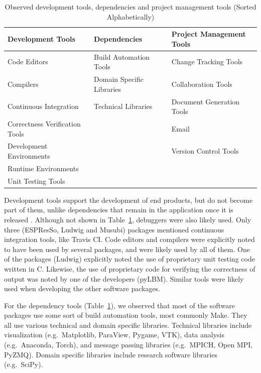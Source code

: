 \documentclass[final, 3p, times, authoryear]{elsarticle}
\begin{document}
\begin{table}[ht!]
	\begin{center}
	\begin{tabular}{ p{5.3 cm} p{4.9 cm} p{5 cm}}
	\toprule
	\textbf{Development Tools} & \textbf{Dependencies} & \textbf{Project
	Management Tools} \\
	\midrule
	Code Editors & Build Automation Tools & Change Tracking Tools\\
	Compilers & Domain Specific Libraries & Collaboration Tools\\
	Continuous Integration & Technical Libraries & Document Generation Tools\\
	Correctness Verification Tools &  & Email\\
	Development Environments &  & Version Control Tools\\
	Runtime Environments &  & \\
	Unit Testing Tools &  & \\
	\bottomrule
	\end{tabular}
	\caption{Observed development tools, dependencies and project management
	tools (Sorted Alphabetically)} \label{tbl_tools}
	\end{center}
\end{table}

Development tools support the development of end products, but do not become
part of them, unlike dependencies that remain in the application once it is
released \citep[p.\ 506]{GhezziEtAl2003}. Although not shown in
Table~\ref{tbl_tools}, debuggers were also likely used.  Only three (ESPResSo,
Ludwig and Musubi) packages mentioned continuous integration tools, like Travis
CI. Code editors and compilers were explicitly noted to have been used by
several packages, and were likely used by all of them. One of the packages
(Ludwig) explicitly noted the use of proprietary unit testing code written in C.
Likewise, the use of proprietary code for verifying the correctness of output
was noted by one of the developers (pyLBM). Similar tools were likely used when
developing the other software packages.

For the dependency tools (Table~\ref{tbl_tools}), we observed that most of the
software packages use some sort of build automation tools, most commonly Make.
They all use various technical and domain specific libraries. Technical
libraries include visualization (e.g.\ Matplotlib, ParaView, Pygame, VTK), data
analysis (e.g.\ Anaconda, Torch), and message passing libraries (e.g.\ MPICH,
Open MPI, PyZMQ). Domain specific libraries include research software libraries
(e.g.\ SciPy).
\end{document}
